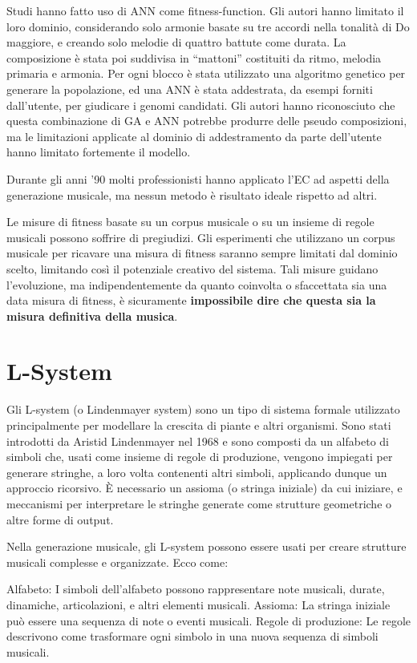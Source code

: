\documentclass[a4paper,12pt]{report}
\begin{document}
Studi hanno fatto uso di ANN come fitness-function. 
Gli autori hanno limitato il loro dominio, considerando solo armonie basate su tre accordi nella tonalità di Do maggiore, e creando solo melodie di quattro battute come durata. 
La composizione è stata poi suddivisa in “mattoni” costituiti da ritmo, melodia primaria e armonia. 
Per ogni blocco è stata utilizzato una algoritmo genetico per generare la popolazione, ed una ANN è stata addestrata, da esempi forniti dall'utente, per giudicare i genomi candidati.
Gli autori hanno riconosciuto che questa combinazione di GA e ANN potrebbe produrre delle pseudo composizioni, 
ma le limitazioni applicate al dominio di addestramento da parte dell'utente hanno limitato fortemente il modello.

Durante gli anni ’90 molti professionisti hanno applicato l’EC ad aspetti della generazione musicale, ma nessun metodo è risultato ideale rispetto ad altri. 

Le misure di fitness basate su un corpus musicale o su un insieme di regole musicali possono soffrire di pregiudizi. 
Gli esperimenti che utilizzano un corpus musicale per ricavare una misura di fitness saranno sempre limitati dal dominio scelto, limitando così il potenziale creativo del sistema. 
Tali misure guidano l’evoluzione, ma indipendentemente da quanto coinvolta o sfaccettata sia una data misura di fitness, è sicuramente \textbf{impossibile dire che questa sia la misura definitiva della musica}.

\section{L-System}

Gli L-system (o Lindenmayer system) sono un tipo di sistema formale utilizzato principalmente per modellare la crescita di piante e altri organismi. 
Sono stati introdotti da Aristid Lindenmayer nel 1968 e sono composti da un alfabeto di simboli che, usati come insieme di regole di produzione, vengono impiegati per generare stringhe, a loro volta contenenti altri simboli, applicando dunque un approccio ricorsivo.
È necessario un assioma (o stringa iniziale) da cui iniziare, e meccanismi per interpretare le stringhe generate come strutture geometriche o altre forme di output.

Nella generazione musicale, gli L-system possono essere usati per creare strutture musicali complesse e organizzate. Ecco come:

Alfabeto: I simboli dell'alfabeto possono rappresentare note musicali, durate, dinamiche, articolazioni, e altri elementi musicali.
Assioma: La stringa iniziale può essere una sequenza di note o eventi musicali.
Regole di produzione: Le regole descrivono come trasformare ogni simbolo in una nuova sequenza di simboli musicali.
\end{document}
